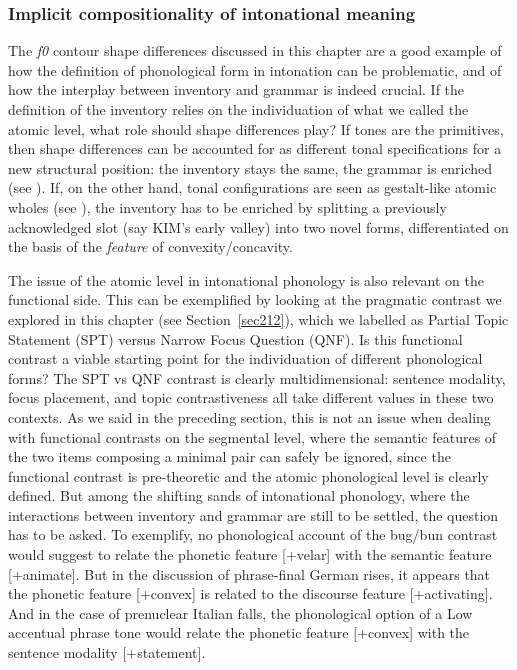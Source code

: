 \subsubsection{Implicit compositionality of intonational meaning}\label{sec2432}
The \textit{f0} contour shape differences discussed in this chapter are a good example of how the definition of phonological form in intonation can be problematic, and of how the interplay between inventory and grammar is indeed crucial. If the definition of the inventory relies on the individuation of what we called the atomic level, what role should shape differences play? If tones are the primitives, then shape differences can be accounted for as different tonal specifications for a new structural position: the inventory stays the same, the grammar is enriched (see \citealt{petrone2008tonal}). If, on the other hand, tonal configurations are seen as gestalt-like atomic wholes (see \citealt{dombrowski2005acoustic}), the inventory has to be enriched by splitting a previously acknowledged slot (say KIM's early valley) into two novel forms, differentiated on the basis of the \textit{feature} of convexity/concavity.

The issue of the atomic level in intonational phonology is also relevant on the functional side. This can be exemplified by looking at the pragmatic contrast we explored in this chapter (see Section~\ref{sec212}), which we labelled as Partial Topic Statement (SPT) versus Narrow Focus Question (QNF). Is this functional contrast a viable starting point for the individuation of different phonological forms? The SPT vs QNF contrast is clearly multidimensional: sentence modality, focus placement, and topic contrastiveness all take different values in these two contexts. As we said in the preceding section, this is not an issue when dealing with functional contrasts on the segmental level, where the semantic features of the two items composing a minimal pair can safely be ignored, since the functional contrast is pre-theoretic and the atomic phonological level is clearly defined. But among the shifting sands of intonational phonology, where the interactions between inventory and grammar are still to be settled, the question has to be asked. To exemplify, no phonological account of the bug/bun contrast would suggest to relate the phonetic feature [+velar] with the semantic feature [+animate]. But in the discussion of phrase-final German rises, it appears that the phonetic feature [+convex] is related to the discourse feature [+activating]. And in the case of prenuclear Italian falls, the phonological option of a Low accentual phrase tone would relate the phonetic feature [+convex] with the sentence modality [+statement].

